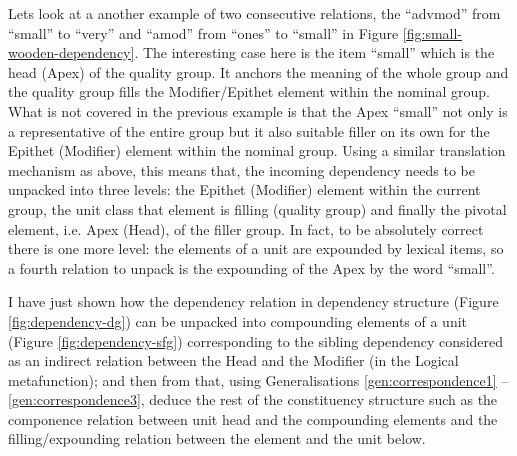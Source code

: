     Lets look at a another example of two consecutive relations, the ``advmod'' from ``small'' to ``very'' and ``amod'' from ``ones'' to ``small'' in Figure \ref{fig:small-wooden-dependency}. The interesting case here is the item ``small'' which is the head (Apex) of the quality group. It anchors the meaning of the whole group and the quality group fills the Modifier/Epithet element within the nominal group. What is not covered in the previous example is that the Apex ``small'' not only is a representative of the entire group but it also suitable filler on its own for the Epithet (Modifier) element within the nominal group. Using a similar translation mechanism as above, this means that, the incoming dependency needs to be unpacked into three levels: the Epithet (Modifier) element within the current group, the unit class that element is filling (quality group) and finally the pivotal element, i.e. Apex (Head), of the filler group. In fact, to be absolutely correct there is one more level: the elements of a unit are expounded by lexical items, so a fourth relation to unpack is the expounding of the Apex by the word ``small''.

    I have just shown how the dependency relation in dependency structure (Figure \ref{fig:dependency-dg}) can be unpacked into compounding elements of a unit (Figure \ref{fig:dependency-sfg}) corresponding to the sibling dependency considered as an indirect relation between the Head and the Modifier (in the Logical metafunction); and then from that, using Generalisations \ref{gen:correspondence1} -- \ref{gen:correspondence3}, deduce the rest of the constituency structure such as the componence relation between unit head and the compounding elements and the filling/expounding relation between the element and the unit below. 


